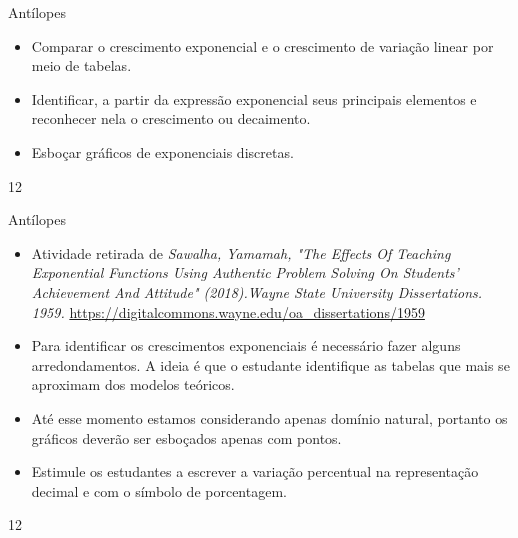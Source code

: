 \def\currentcolor{session2}
\begin{objectives}{Antílopes}
{
\begin{itemize}
\item Comparar o crescimento exponencial e o crescimento de variação linear por meio de tabelas.
\end{itemize}


\begin{itemize}
\item Identificar, a partir da expressão exponencial seus principais elementos e reconhecer nela o crescimento ou decaimento.

\item Esboçar gráficos de exponenciais discretas.
\end{itemize}

}{1}{2}
\end{objectives}
\begin{sugestions}{Antílopes}
{
\begin{itemize}
\item Atividade retirada de \textit{Sawalha, Yamamah, "The Effects Of Teaching Exponential Functions Using Authentic Problem Solving On Students’ Achievement
And Attitude" (2018).Wayne State University Dissertations. 1959.}
\url{https://digitalcommons.wayne.edu/oa_dissertations/1959}

\item Para identificar os crescimentos exponenciais é necessário fazer alguns arredondamentos. A ideia é que o estudante identifique as tabelas que mais se aproximam dos modelos teóricos.
\end{itemize}

\begin{itemize}
\item Até esse momento estamos considerando apenas domínio natural, portanto os gráficos deverão ser esboçados apenas com pontos.

\item Estimule os estudantes a escrever a variação percentual na representação decimal e com o símbolo de porcentagem.

\end{itemize}

}{1}{2}
\end{sugestions}
